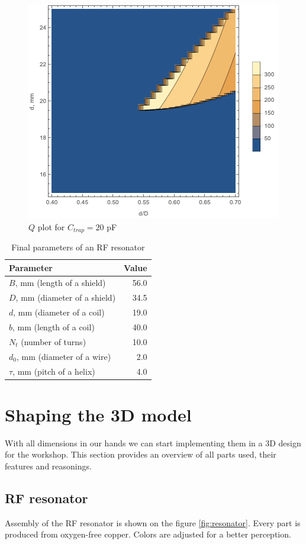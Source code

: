 \begin{figure}[!h]
\centering
\includegraphics[width=.78\textwidth]{images/q_plot_siverns_tex_20}
\caption{$Q$ plot for $C_{trap} = 20$ pF}
\label{fig:q_plot_20}
\end{figure}
\begin{table}[h]
\centering
\begin{tabular}{| l | r |}
	\hline
	Parameter & Value\\
	\hline \hline
	$B$, mm (length of a shield) & 56.0 \\
	\hline
	$D$, mm (diameter of a shield) & 34.5 \\
	\hline
	$d$, mm (diameter of a coil) & 19.0 \\
	\hline
	$b$, mm (length of a coil) & 40.0 \\
	\hline
	$N_{t}$ (number of turns) & 10.0 \\
	\hline
	$d_0$, mm (diameter of a wire) & 2.0 \\
	\hline
	$\tau$, mm (pitch of a helix) & 4.0 \\
	\hline
\end{tabular}
\caption{Final parameters of an RF resonator}
\label{tbl:final_parameters}
\end{table}

\section{Shaping the 3D model}
With all dimensions in our hands we can start implementing them in a 3D design for the workshop. This section provides an overview of all parts used, their features and reasonings.

\clearpage
\subsection{RF resonator}
\label{subsection:rf_resonator_3d}
Assembly of the RF resonator is shown on the figure \ref{fig:resonator}. Every part is produced from oxygen-free copper. Colors are adjusted for a better perception.

